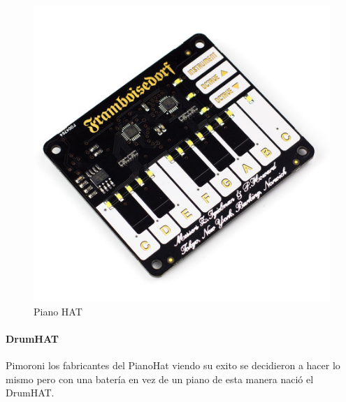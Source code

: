 \documentclass[a4paper,11pt,oneside]{book}
\begin{document}
\begin{figure}[H]
\begin{center}
\includegraphics[scale=0.5]{Imagenes/Piano_HAT.jpg}
\caption{Piano HAT}
\label{Piano HAT}
\end{center}
\end{figure}



\paragraph{DrumHAT}

Pimoroni los fabricantes del PianoHat viendo su exito se decidieron a hacer lo mismo pero con una batería en vez de un piano de esta manera nació el DrumHAT.
\end{document}
